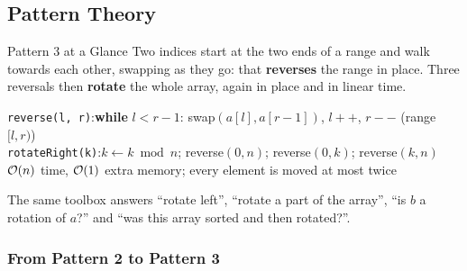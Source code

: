 \subsection{Pattern Theory}
\label{ssec:ch1-p3-theory}

\begin{patternbox}{Pattern 3 at a Glance}
Two indices start at the two ends of a range and walk towards each other, swapping as they go: that \textbf{reverses} the range in place. Three reversals then \textbf{rotate} the whole array, again in place and in linear time.

\begin{center}
\end{center}

\begin{recurrencebox}
\centering
\texttt{reverse(l, r)}:\quad \textbf{while} $l < r-1$:\; swap$(a[l], a[r-1])$,\; $l{+}{+}$,\; $r{-}{-}$ \qquad (range $[l, r)$)\\[3pt]
\texttt{rotateRight(k)}:\quad $k \leftarrow k \bmod n$;\; reverse$(0, n)$;\; reverse$(0, k)$;\; reverse$(k, n)$\\[2pt]
$\mathcal{O}(n)$ time, $\mathcal{O}(1)$ extra memory; every element is moved at most twice
\end{recurrencebox}
The same toolbox answers ``rotate left'', ``rotate a part of the array'', ``is $b$ a rotation of $a$?'' and ``was this array sorted and then rotated?''.
\end{patternbox}

\subsubsection*{From Pattern 2 to Pattern 3}

